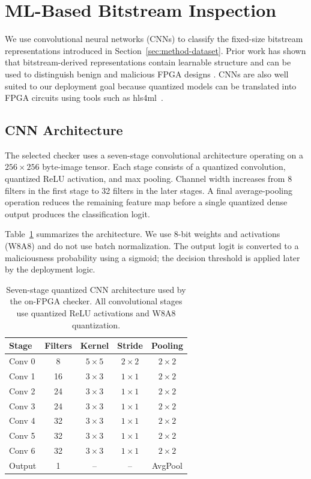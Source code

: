 \section{ML-Based Bitstream Inspection}
\label{sec:ml-inspection}

We use convolutional neural networks (CNNs) to classify the fixed-size
bitstream representations introduced in Section~\ref{sec:method-dataset}. Prior work
has shown that bitstream-derived representations contain learnable structure and
can be used to distinguish benign and malicious FPGA designs
\cite{rettkowski2019inspection,chaudhuri2022detection,
elnaggar2023learning,palumbo2022trojan}. CNNs are also well suited to our
deployment goal because quantized models can be translated into FPGA circuits
using tools such as hls4ml~\cite{duarte2018fast,aarrestad2021fast}.

\subsection{CNN Architecture}
\label{sec:cnn-architecture}

The selected checker uses a seven-stage convolutional architecture operating on
a $256\times256$ byte-image tensor. Each stage consists of a quantized
convolution, quantized ReLU activation, and max pooling. Channel width increases
from 8 filters in the first stage to 32 filters in the later stages. A final
average-pooling operation reduces the remaining feature map before a single
quantized dense output produces the classification logit.

Table~\ref{tab:cnn-architecture} summarizes the architecture. We use 8-bit
weights and activations (W8A8) and do not use batch normalization. The output
logit is converted to a maliciousness probability using a sigmoid; the decision
threshold is applied later by the deployment logic.

\begin{table}[t]
\centering
\caption{Seven-stage quantized CNN architecture used by the on-FPGA
checker. All convolutional stages use quantized ReLU activations and W8A8
quantization.}
\label{tab:cnn-architecture}
\small
\begin{tabular}{lcccc}
\toprule
Stage & Filters & Kernel & Stride & Pooling \tabularnewline
\midrule
Conv 0 & 8 & $5\times5$ & $2\times2$ & $2\times2$ \tabularnewline
Conv 1 & 16 & $3\times3$ & $1\times1$ & $2\times2$ \tabularnewline
Conv 2 & 24 & $3\times3$ & $1\times1$ & $2\times2$ \tabularnewline
Conv 3 & 24 & $3\times3$ & $1\times1$ & $2\times2$ \tabularnewline
Conv 4 & 32 & $3\times3$ & $1\times1$ & $2\times2$ \tabularnewline
Conv 5 & 32 & $3\times3$ & $1\times1$ & $2\times2$ \tabularnewline
Conv 6 & 32 & $3\times3$ & $1\times1$ & $2\times2$ \tabularnewline
Output & 1 & -- & -- & AvgPool \tabularnewline
\bottomrule
\end{tabular}
\end{table}

